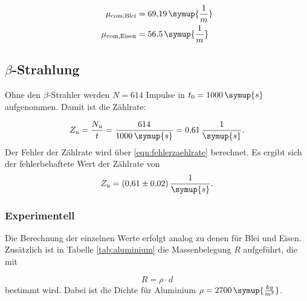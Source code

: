 \begin{equation*}
\begin{aligned}
\mu_{\text{com,Blei}} &= 69{,}19 \,\symup{\frac{1}{m}} \\
\mu_{\text{com,Eisen}} &= 56{,}5 \,\symup{\frac{1}{m}} \\
\end{aligned}
\end{equation*}









\subsection{{\texorpdfstring{$\beta$}{Beta}}-Strahlung}
Ohne den $\beta$-Strahler werden $N = 614$ Impulse in $t_0 = 1000\,\symup{s}$ aufgenommen. Damit ist die Zählrate:

\begin{equation}
Z_{\text{u}} = \frac{N_{\text{u}}}{t} = \frac{614}{1000\,\symup{s}} = 0{,}61\,\frac{1}{\symup{s}}.
\label{eqn:zaehlrate}
\end{equation}
Der Fehler der Zählrate wird über \ref{eqn:fehlerzaehlrate} berechnet. Es ergibt sich der fehlerbehaftete Wert der Zählrate von 
\begin{equation*}
Z_{\text{u}} =  (0{,}61 \pm 0{,}02)\,\frac{1}{\symup{s}}.
\end{equation*}


\subsubsection{Experimentell}
Die Berechnung der einzelnen Werte erfolgt analog zu denen für Blei und Eisen. Zusätzlich ist in Tabelle \ref{tab:aluminium} die Massenbelegung $R$ aufgeführt, die mit

\begin{equation*}
R = \rho \cdot d
\end{equation*}
bestimmt wird. Dabei ist die Dichte für Aluminium $\rho = 2700\,\symup{\frac{kg}{m^3}}$.

